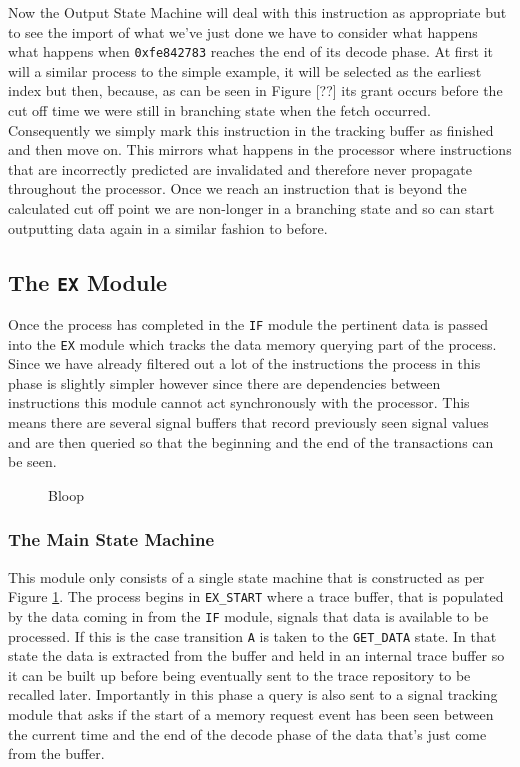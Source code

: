 Now the Output State Machine will deal with this instruction as appropriate but to see the import of what we've just done we have to consider what happens what happens when \texttt{0xfe842783} reaches the end of its decode phase. At first it will a similar process to the simple example, it will be selected as the earliest index but then, because, as can be seen in Figure [??] its grant occurs before the cut off time we were still in branching state when the fetch occurred. Consequently we simply mark this instruction in the tracking buffer as finished and then move on. This mirrors what happens in the processor where instructions that are incorrectly predicted are invalidated and therefore never propagate throughout the processor. Once we reach an instruction that is beyond the calculated cut off point we are non-longer in a branching state and so can start outputting data again in a similar fashion to before.


\subsection{The \texttt{EX} Module}

Once the process has completed in the \texttt{IF} module the pertinent data is passed into the \texttt{EX} module which tracks the data memory querying part of the process. Since we have already filtered out a lot of the instructions the process in this phase is slightly simpler however since there are dependencies between instructions this module cannot act synchronously with the processor. This means there are several signal buffers that record previously seen signal values and are then queried so that the beginning and the end of the transactions can be seen. 

\begin{figure}[htbp]
	
	\caption{Bloop}
	\label{fig:ex-state-machine}
\end{figure} 

\subsubsection{The Main State Machine}

This module only consists of a single state machine that is constructed as per Figure \ref{fig:ex-state-machine}. The process begins in \texttt{EX\_START} where a trace buffer, that is populated by the data coming in from the \texttt{IF} module, signals that data is available to be processed. If this is the case transition \texttt{A} is taken to the \texttt{GET\_DATA} state. In that state the data is extracted from the buffer and held in an internal trace buffer so it can be built up before being eventually sent to the trace repository to be recalled later. Importantly in this phase a query is also sent to a signal tracking module that asks if the start of a memory request event has been seen between the current time and the end of the decode phase of the data that's just come from the buffer. 

